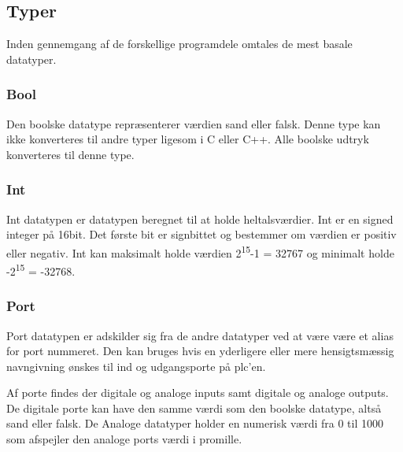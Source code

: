 \subsection{Typer}
Inden gennemgang af de forskellige programdele omtales de mest basale datatyper.

\subsubsection{Bool}
Den boolske datatype repræsenterer værdien sand eller falsk. Denne type kan ikke konverteres til andre typer ligesom i C eller C++. Alle boolske udtryk konverteres til denne type.

\subsubsection{Int}
Int datatypen er datatypen beregnet til at holde heltalsværdier. Int er en signed integer på 16bit. Det første bit er signbittet og bestemmer om værdien er positiv eller negativ. Int kan maksimalt holde værdien 2\textsuperscript{15}-1 = 32767 og minimalt holde -2\textsuperscript{15} = -32768.

\subsubsection{Port}
Port datatypen er adskilder sig fra de andre datatyper ved at være være et alias for port nummeret. Den kan bruges hvis en yderligere eller mere hensigtsmæssig navngivning ønskes til ind og udgangsporte på \gls{plc}'en.

Af porte findes der digitale og analoge inputs samt digitale og analoge outputs. De digitale porte kan have den samme værdi som den boolske datatype, altså sand eller falsk. De Analoge datatyper holder en numerisk værdi fra 0 til 1000 som afspejler den analoge ports værdi i promille.
